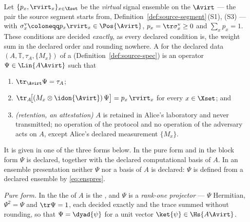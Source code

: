 \begin{definition}\label{def:srcert}
Let $\{p_x,\rvirt_x\}_{x\in\Xset}$ be the \emph{virtual} signal ensemble on
the  $\Avirt$ --- the pair the source segment
starts from, Definition~\ref{def:source-segment}\,(S1), (S3) --- with
 $\sigma^{\mathrm v}_x\coloneqq p_x\rvirt_x\in\Pos{\Avirt}$,
$p_x=\tr\sigma^{\mathrm v}_x\ge0$ and $\sum_xp_x=1$. These conditions are
decided \emph{exactly}, as every declared condition is, the weight sum in
the declared order and rounding nowhere. A  for the declared data $(A,\mathbb{T},\tau_A,\{M_x\})$ of a
 (Definition~\ref{def:source-spec}) is an operator
$\Psi\in\Lin{A\Avirt}$ such that
\begin{enumerate}[label=(SR\arabic*),leftmargin=3.0em]
\item $\tr_{\Avirt}\Psi=\tau_A$;
\item $\tr_{A}\!\big[(M_x\otimes\idon{\Avirt})\,\Psi\big]=p_x\,\rvirt_x$
for every $x\in\Xset$; and
\item \emph{(retention, an attestation)} $A$ is retained in Alice's
laboratory and never transmitted; no operation of the protocol and no
operation of the adversary acts on $A$, except Alice's declared measurement
$\{M_x\}$.
\end{enumerate}
It is given in one of the three forms below. In the pure form and in the
block form $\Psi$ is declared, together with the declared computational basis
of $A$. In an ensemble presentation neither $\Psi$ nor a basis of $A$ is
declared: $\Psi$ is defined from a declared ensemble by \eqref{eq:enspres}.

\emph{Pure form.} In the  the  of $A$ is the
, and $\Psi$ is a \emph{rank-one projector} --- $\Psi$
Hermitian, $\Psi^2=\Psi$ and $\tr\Psi=1$, each decided exactly and the trace
summed without rounding, so that $\Psi=\dyad{\psi}$ for a unit vector
$\ket{\psi}\in\Hs{A\Avirt}$.


\end{definition}
